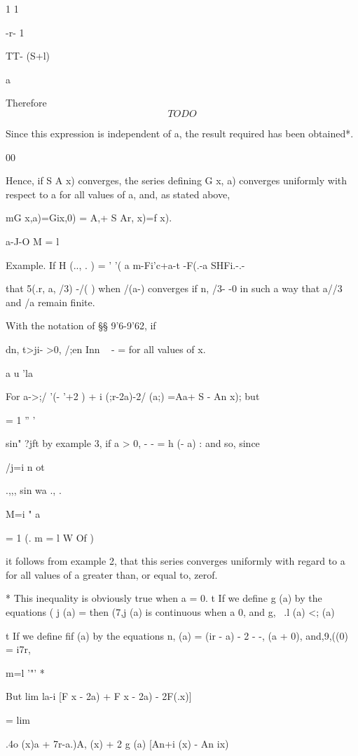 1 1

-r- 1

 TT- (S+l)

a

%
%

Therefore
$$
TODO
$$

Since this expression is independent of a, the result required has
been obtained*.

00

Hence, if S A x) converges, the series defining G x, a) converges
uniformly with respect to a for all values of a, and, as stated above,
\ \ {mG x,a)=Gix,0) = A,+ S Ar, x)=f x).

a-J-O M = l

Example. If H (.., . ) = ' '( a m-Fi'c+a-t -F(.-a SHFi.-.-

that 5(.r, a, /3) -/( ) when /(a-) converges if n, /3- -0 in such a
way that a//3 and /a remain finite. 

With the notation of §§ 9'6-9'62, if

dn, t>ji- >0, /;en Inn ~ - = for all values of x.

a u 'la

For a->;/ '(- '+2 ) + i (;r-2a)-2/ (a;) =Aa+ S - An x); but

  = 1 '' '

  sin" ?jft by example 3, if a > 0, - - = h (\pi - a) : and so,
since

/j=i n ot

.,,, sin wa ., .

M=i " a

  = 1 (. m = l W Of )

it follows from example 2, that this series converges uniformly
with regard to a for all values of a greater than, or equal to, zerof.

* This inequality is obviously true when a = 0. t If we define g (a)
by the equations ( j (a) = then (7,j (a) is continuous when a 0, and
g, \ .l (a) <; (a)

t If we define fif (a) by the equations n, (a) = (ir - a) - 2 - -,
(a + 0), and,9,((0) = i7r,

m=l '"' *

%
%

But lim la-i [F x - 2a) + F x - 2a) - 2F(.x)]

= lim

.4o (x)a + 7r-a.)A, (x) + 2 g (a) [An+i (x) - An ix)

}
